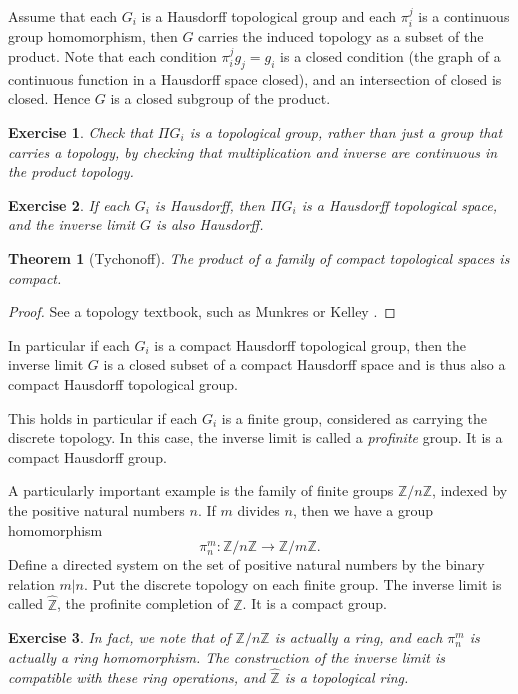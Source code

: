 \documentclass{amsart}
\newcommand{\ring}[1]{\mathbb{#1}}
\newtheorem{theorem}[equation]{Theorem}
\newtheorem{exercise}{Exercise}
\def\newterm#1{{\it #1}}
\begin{document}
Assume that each $G_i$ is a Hausdorff topological group and each
$\pi^j_i$ is a continuous group homomorphism, then $G$ carries the
induced topology as a subset of the product.  Note that each condition
$\pi^j_i g_j = g_i$ is a closed condition (the graph of a continuous
function in a Hausdorff space closed), and an intersection of closed
is closed.  Hence $G$ is a closed subgroup of the product.

\begin{exercise} Check that $\Pi G_i$ is a topological group, rather
  than just a group that carries a topology, by checking that
  multiplication and inverse are continuous in the product topology.
\end{exercise}

\begin{exercise}
If each $G_i$ is Hausdorff, then $\Pi G_i$ is a Hausdorff topological
space, and the inverse limit $G$ is also Hausdorff.
\end{exercise}

\begin{theorem}[Tychonoff]  The product of  a family of compact topological
spaces is compact.
\end{theorem}

\begin{proof} See a topology textbook, such as Munkres or Kelley \cite[page 143]{Kelley}.
\end{proof}

In particular if each $G_i$ is a compact Hausdorff topological group, then the inverse limit
$G$ is a closed subset of a compact Hausdorff space and is thus also
a compact Hausdorff topological group.

This holds in particular if each $G_i$ is a finite group, considered as carrying
the discrete topology.  In this case, the inverse limit is called a \newterm{profinite}
group.  It is a compact Hausdorff group.

A particularly important example is the family of finite groups $\ring{Z}/n\ring{Z}$,
indexed by the positive natural numbers $n$.  If $m$ divides $n$, then we have a group
homomorphism
\[
\pi^m_n:\ring{Z}/n\ring{Z} \to \ring{Z}/m\ring{Z}.
\]
Define a directed system on the set of positive natural numbers 
by the binary relation $m | n$.
Put the discrete topology on each finite group.
The inverse limit is called $\hat{\ring{Z}}$, the profinite completion of $\ring{Z}$.
It is a compact group.

\begin{exercise}
In fact, we note that of $\ring{Z}/n\ring{Z}$ is actually a ring, and each $\pi^m_n$
is actually a ring homomorphism.  The construction of the inverse limit is compatible
with these ring operations, and $\hat{\ring{Z}}$ is a topological ring.
\end{exercise}
\end{document}
